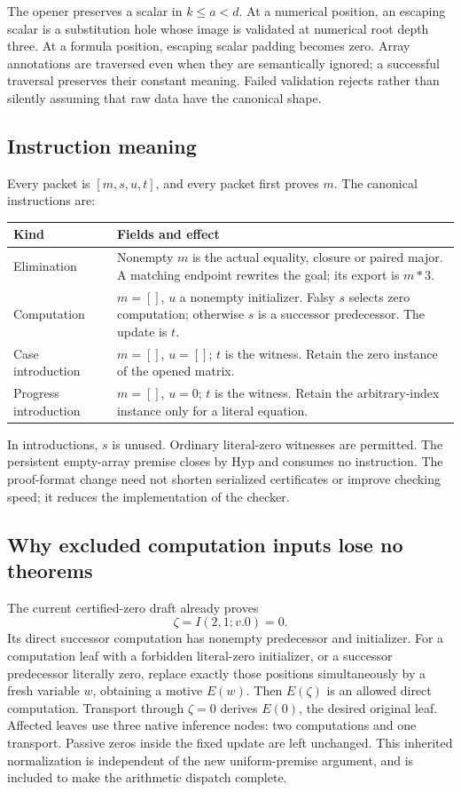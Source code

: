 \documentclass[11pt,letterpaper]{article}
\theoremstyle{definition}\newtheorem{definition}[theorem]{Definition}
\theoremstyle{remark}\newtheorem{remark}[theorem]{Remark}
\begin{document}
The opener preserves a scalar in \(k\le a<d\). At a numerical
position, an escaping scalar is a substitution hole whose image is
validated at numerical root depth three. At a formula position,
escaping scalar padding becomes zero. Array annotations are traversed
even when they are semantically ignored; a successful traversal preserves
their constant meaning. Failed validation rejects rather than silently
assuming that raw data have the canonical shape.

\subsection{Instruction meaning}

Every packet is \([m,s,u,t]\), and every packet first proves \(m\).
The canonical instructions are:
\begin{center}\small
\begin{tabularx}{\linewidth}{lX}\toprule
Kind & Fields and effect\\\midrule
Elimination & Nonempty \(m\) is the actual equality, closure or paired
major. A matching endpoint rewrites the goal; its export is \(m*3\).\\
Computation & \(m=[]\), \(u\) a nonempty initializer. Falsy \(s\)
selects zero computation; otherwise \(s\) is a successor predecessor.
The update is \(t\).\\
Case introduction & \(m=[]\), \(u=[]\); \(t\) is the witness.
Retain the zero instance of the opened matrix.\\
Progress introduction & \(m=[]\), \(u=0\); \(t\) is the witness.
Retain the arbitrary-index instance only for a literal equation.\\\bottomrule
\end{tabularx}
\end{center}
In introductions, \(s\) is unused. Ordinary literal-zero witnesses
are permitted. The persistent empty-array premise closes by Hyp and
consumes no instruction. The proof-format change need not shorten
serialized certificates or improve checking speed; it reduces the
implementation of the checker.

\subsection{Why excluded computation inputs lose no theorems}

The current certified-zero draft already proves
\[
                         \zeta=I(2,1;v.0)=0.
\]
Its direct successor computation has nonempty predecessor and initializer.
For a computation leaf with a forbidden literal-zero initializer, or a
successor predecessor literally zero, replace exactly those positions
simultaneously by a fresh variable \(w\), obtaining a motive \(E(w)\).
Then \(E(\zeta)\) is an allowed direct computation. Transport through
\(\zeta=0\) derives \(E(0)\), the desired original leaf. Affected
leaves use three native inference nodes: two computations and one
transport. Passive zeros inside the fixed update are left unchanged.
This inherited normalization is independent of the new uniform-premise
argument, and is included to make the arithmetic dispatch complete.
\end{document}
